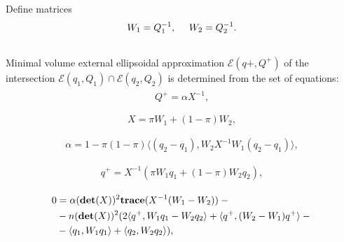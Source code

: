 \documentclass[letterpaper,10pt,english]{sphinxmanual}
\begin{document}
Define matrices
\begin{gather}
\begin{split}W_1 = Q_1^{-1}, ~~~~ W_2 = Q_2^{-1} .\label{wmatrices}\end{split}\notag\\\begin{split}\end{split}\notag
\end{gather}
Minimal volume external ellipsoidal approximation
${\mathcal E}(q+,Q^+)$ of the intersection
${\mathcal E}(q_1,Q_1)\cap{\mathcal E}(q_2,Q_2)$ is determined
from the set of equations:
\label{main_source:equation-fusion1}\begin{gather}
\begin{split}Q^+  = \alpha X^{-1}, \\\end{split}\label{main_source-fusion1}
\end{gather}\label{main_source:equation-fusion2}\begin{gather}
\begin{split}X  =  \pi W_1 + (1-\pi)W_2,\\\end{split}\label{main_source-fusion2}
\end{gather}\label{main_source:equation-fusion3}\begin{gather}
\begin{split}\alpha  =  1-\pi(1-\pi)\langle(q_2-q_1), W_2X^{-1}W_1(q_2-q_1)\rangle, \\\end{split}\label{main_source-fusion3}
\end{gather}\label{main_source:equation-fusion4}\begin{gather}
\begin{split}q^+  = X^{-1}(\pi W_1q_1 + (1-\pi)W_2q_2), \\\end{split}\label{main_source-fusion4}
\end{gather}\label{main_source:equation-fusion5}\begin{gather}
\begin{split}0 &=  \alpha({\bf det}(X))^2{\bf trace}(X^{-1}(W_1-W_2)) - {}\\
  &- n({\bf det}(X))^2 (2\langle q^+,W_1q_1-W_2q_2\rangle + \langle q^+,(W_2-W_1)q^+\rangle - {}\\
  &- \langle q_1,W_1q_1\rangle + \langle q_2,W_2q_2\rangle),\end{split}\label{main_source-fusion5}
\end{gather}
\end{document}
